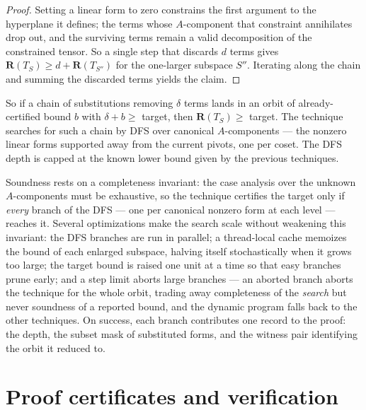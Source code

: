 \documentclass[11pt]{article}
\theoremstyle{definition}
\newcommand{\R}{\mathbf{R}}
\begin{document}
\begin{proof}
  Setting a linear form to zero constrains the first argument to the hyperplane it
  defines; the terms whose $A$-component that constraint annihilates drop out, and the
  surviving terms remain a valid decomposition of the constrained tensor. So a single
  step that discards $d$ terms gives $\R(T_S)\ge d+\R(T_{S''})$ for the one-larger
  subspace $S''$. Iterating along the chain and summing the discarded terms yields the
  claim.
\end{proof}

So if a chain of substitutions removing $\delta$ terms lands in an orbit of
already-certified bound $b$ with $\delta+b\ge$ target, then $\R(T_S)\ge$ target. The
technique searches for such a chain by DFS over canonical $A$-components --- the
nonzero linear forms supported away from the current pivots, one per coset.
The DFS depth is capped at the known lower bound given by the previous techniques.

Soundness rests on a completeness invariant: the case analysis over the unknown
$A$-components must be exhaustive, so the technique certifies the target only if
\emph{every} branch of the DFS --- one per canonical nonzero form at each level ---
reaches it. Several optimizations make the search scale without weakening this
invariant: the DFS branches are run in parallel; a thread-local cache memoizes the
bound of each enlarged subspace, halving itself stochastically when it grows too
large; the target bound is raised one unit at a time so that easy branches prune
early; and a step limit aborts large branches --- an aborted branch aborts the
technique for the whole orbit, trading away completeness of the \emph{search} but
never soundness of a reported bound, and the dynamic program falls back to the other
techniques. On success, each branch contributes one record to the proof: the depth,
the subset mask of substituted forms, and the witness pair identifying the orbit it
reduced to.

\section{Proof certificates and verification}\label{sec:certificates}
\end{document}
